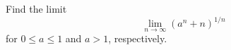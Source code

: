 \begin{exercise}
  \label{ex:hw04:exponential-root-limit}
  Find the limit
  \[
    \lim_{n\to\infty}(a^n+n)^{1/n}
  \]
  for $0\le a\le1$ and $a>1$, respectively.
\end{exercise}
